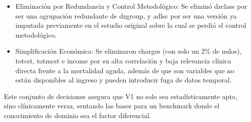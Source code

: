 \begin{itemize}
  \item Eliminación por Redundancia y Control Metodológico: Se eliminó dzclass por
    ser una agrupación redundante de dzgroup, y adlsc por ser una versión ya
    imputada previamente en el estudio original sobre la cual se perdió el
    control metodológico.
  \item Simplificación Económica: Se eliminaron charges (con solo un 2\% de
    nulos), totcst, totmcst e income por su alta correlación y
    baja relevancia clínica directa frente a la mortalidad aguda, además de que
    son variables que no están disponibles al ingreso y pueden introducir fuga
    de datos temporal.
\end{itemize}

Este conjunto de decisiones asegura que V1 no solo sea
estadísticamente apto, sino clínicamente veraz, sentando las bases para un
benchmark donde el conocimiento de dominio sea el factor diferencial.

